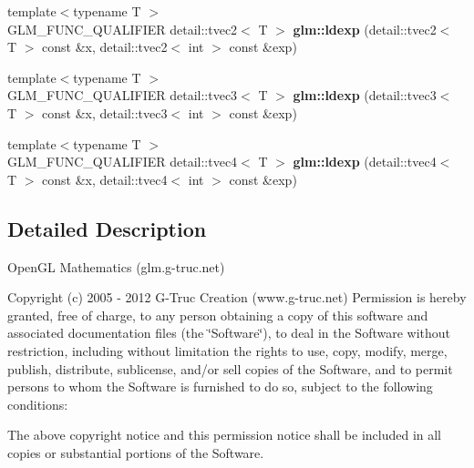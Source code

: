 \begin{DoxyCompactItemize}
\item 
\hypertarget{namespaceglm_af3705e92f7dbca7dee3a2412d4033833}{{\footnotesize template$<$typename T $>$ }\\\-G\-L\-M\-\_\-\-F\-U\-N\-C\-\_\-\-Q\-U\-A\-L\-I\-F\-I\-E\-R \*
detail\-::tvec2$<$ \-T $>$ {\bfseries glm\-::ldexp} (detail\-::tvec2$<$ \-T $>$ const \&x, detail\-::tvec2$<$ int $>$ const \&exp)}\label{namespaceglm_af3705e92f7dbca7dee3a2412d4033833}

\item 
\hypertarget{namespaceglm_a5de427047c366728ca1257c06fa38e2d}{{\footnotesize template$<$typename T $>$ }\\\-G\-L\-M\-\_\-\-F\-U\-N\-C\-\_\-\-Q\-U\-A\-L\-I\-F\-I\-E\-R \*
detail\-::tvec3$<$ \-T $>$ {\bfseries glm\-::ldexp} (detail\-::tvec3$<$ \-T $>$ const \&x, detail\-::tvec3$<$ int $>$ const \&exp)}\label{namespaceglm_a5de427047c366728ca1257c06fa38e2d}

\item 
\hypertarget{namespaceglm_aed70eedaf2ffabe7cb6a36d16f83181d}{{\footnotesize template$<$typename T $>$ }\\\-G\-L\-M\-\_\-\-F\-U\-N\-C\-\_\-\-Q\-U\-A\-L\-I\-F\-I\-E\-R \*
detail\-::tvec4$<$ \-T $>$ {\bfseries glm\-::ldexp} (detail\-::tvec4$<$ \-T $>$ const \&x, detail\-::tvec4$<$ int $>$ const \&exp)}\label{namespaceglm_aed70eedaf2ffabe7cb6a36d16f83181d}

\end{DoxyCompactItemize}


\subsection{\-Detailed \-Description}
\-Open\-G\-L \-Mathematics (glm.\-g-\/truc.\-net)

\-Copyright (c) 2005 -\/ 2012 \-G-\/\-Truc \-Creation (www.\-g-\/truc.\-net) \-Permission is hereby granted, free of charge, to any person obtaining a copy of this software and associated documentation files (the \char`\"{}\-Software\char`\"{}), to deal in the \-Software without restriction, including without limitation the rights to use, copy, modify, merge, publish, distribute, sublicense, and/or sell copies of the \-Software, and to permit persons to whom the \-Software is furnished to do so, subject to the following conditions\-:

\-The above copyright notice and this permission notice shall be included in all copies or substantial portions of the \-Software.


